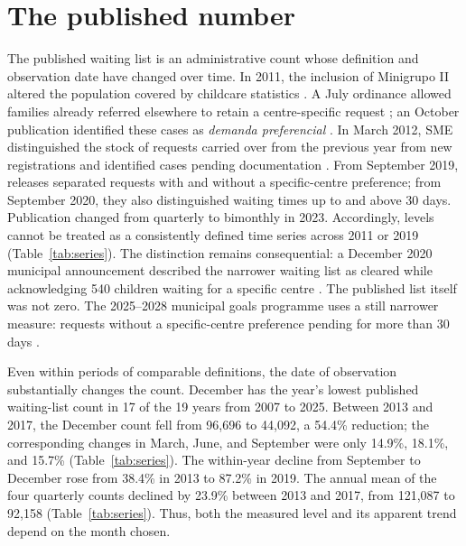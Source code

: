 
\section{The published number}\label{sec:series}\label{sec:stock}

The published waiting list is an administrative count whose definition and observation date have changed over time. In 2011, the inclusion of Minigrupo II altered the population covered by childcare statistics \citep{sme2011nota_reorg}. A July ordinance allowed families already referred elsewhere to retain a centre-specific request \citep{sme2011portaria3478}; an October publication identified these cases as \emph{demanda preferencial} \citep{sme2011nota_pref}. In March 2012, SME distinguished the stock of requests carried over from the previous year from new registrations and identified cases pending documentation \citep{sme2012nota}. From September 2019, releases separated requests with and without a specific-centre preference; from September 2020, they also distinguished waiting times up to and above 30 days. Publication changed from quarterly to bimonthly in 2023. Accordingly, levels cannot be treated as a consistently defined time series across 2011 or 2019 (Table~\ref{tab:series}). The distinction remains consequential: a December 2020 municipal announcement described the narrower waiting list as cleared while acknowledging 540 children waiting for a specific centre \citep{saopaulo2020fila}. The published list itself was not zero. The 2025--2028 municipal goals programme uses a still narrower measure: requests without a specific-centre preference pending for more than 30 days \citep{sme_metas2025}.

Even within periods of comparable definitions, the date of observation substantially changes the count. December has the year's lowest published waiting-list count in 17 of the 19 years from 2007 to 2025. Between 2013 and 2017, the December count fell from 96,696 to 44,092, a 54.4\% reduction; the corresponding changes in March, June, and September were only 14.9\%, 18.1\%, and 15.7\% (Table~\ref{tab:series}). The within-year decline from September to December rose from 38.4\% in 2013 to 87.2\% in 2019. The annual mean of the four quarterly counts declined by 23.9\% between 2013 and 2017, from 121,087 to 92,158 (Table~\ref{tab:series}). Thus, both the measured level and its apparent trend depend on the month chosen.

